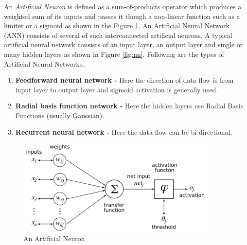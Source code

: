         An \textit{Artificial Neuron} is defined as a sum-of-products operator which produces a weighted sum of its inputs and passes it though a non-linear function such as a limiter or a sigmoid \cite{snyder2010machine} as shown in the Figure \ref{fig:ann}. An Artificial Neural Network (ANN) consists of several of such interconnected artificial neurons. A typical artificial neural network consists of an input layer, an output layer and single or many hidden layers as shown in Figure \ref{fig:nn}. Following are the types of Artificial Neural Networks.
        
        \begin{enumerate}
        	\item \textbf{Feedforward neural network -} Here the direction of data flow is from input layer to output layer and sigmoid activation is generally used.
            \item \textbf{Radial basis function network -} Here the hidden layers use Radial Basis Functions (usually Gaussian).
           	\item \textbf{Recurrent neural network -} Here the data flow can be bi-directional.
        \end{enumerate}
        
		\begin{figure}[hbtp]
			\centering
			\includegraphics[width=0.9\textwidth]{Chapter-2/ann}
			\caption{An Artificial Neuron \cite{aneuronimage}}
			\label{fig:ann}
  		\end{figure}
        
